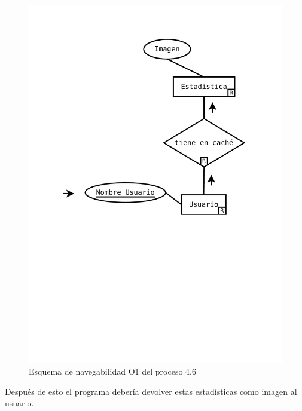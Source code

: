 \begin{figure}[H]
	\centering
	\includegraphics[width=0.5\linewidth]{../Diagramas/pdf/OpEstadisticas6.pdf}
	\caption{Esquema de navegabilidad  O1 del proceso 4.6}
	
	\label{fig:O4.6}
\end{figure}

Después de esto el programa debería devolver estas estadísticas como imagen al usuario.
